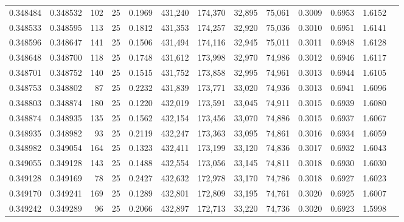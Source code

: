 \begin{tabular}{rrrrrrrrrrrrr}
0.348484 & 0.348532 &   102 &  25 &                                     0.1969 & 431,240 & 174,370 &  32,895 &  75,061 & 0.3009 & 0.6953 & 1.6152 \\
0.348533 & 0.348595 &   113 &  25 &                                     0.1812 & 431,353 & 174,257 &  32,920 &  75,036 & 0.3010 & 0.6951 & 1.6141 \\
0.348596 & 0.348647 &   141 &  25 &                                     0.1506 & 431,494 & 174,116 &  32,945 &  75,011 & 0.3011 & 0.6948 & 1.6128 \\
0.348648 & 0.348700 &   118 &  25 &                                     0.1748 & 431,612 & 173,998 &  32,970 &  74,986 & 0.3012 & 0.6946 & 1.6117 \\
0.348701 & 0.348752 &   140 &  25 &                                     0.1515 & 431,752 & 173,858 &  32,995 &  74,961 & 0.3013 & 0.6944 & 1.6105 \\
0.348753 & 0.348802 &    87 &  25 &                                     0.2232 & 431,839 & 173,771 &  33,020 &  74,936 & 0.3013 & 0.6941 & 1.6096 \\
0.348803 & 0.348874 &   180 &  25 &                                     0.1220 & 432,019 & 173,591 &  33,045 &  74,911 & 0.3015 & 0.6939 & 1.6080 \\
0.348874 & 0.348935 &   135 &  25 &                                     0.1562 & 432,154 & 173,456 &  33,070 &  74,886 & 0.3015 & 0.6937 & 1.6067 \\
0.348935 & 0.348982 &    93 &  25 &                                     0.2119 & 432,247 & 173,363 &  33,095 &  74,861 & 0.3016 & 0.6934 & 1.6059 \\
0.348982 & 0.349054 &   164 &  25 &                                     0.1323 & 432,411 & 173,199 &  33,120 &  74,836 & 0.3017 & 0.6932 & 1.6043 \\
0.349055 & 0.349128 &   143 &  25 &                                     0.1488 & 432,554 & 173,056 &  33,145 &  74,811 & 0.3018 & 0.6930 & 1.6030 \\
0.349128 & 0.349169 &    78 &  25 &                                     0.2427 & 432,632 & 172,978 &  33,170 &  74,786 & 0.3018 & 0.6927 & 1.6023 \\
0.349170 & 0.349241 &   169 &  25 &                                     0.1289 & 432,801 & 172,809 &  33,195 &  74,761 & 0.3020 & 0.6925 & 1.6007 \\
0.349242 & 0.349289 &    96 &  25 &                                     0.2066 & 432,897 & 172,713 &  33,220 &  74,736 & 0.3020 & 0.6923 & 1.5998 \\

\end{tabular}
